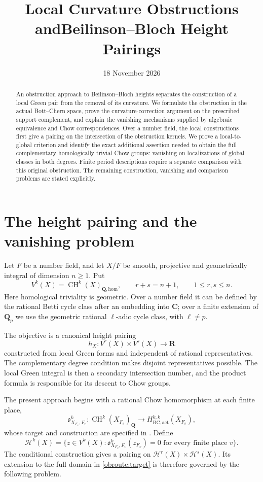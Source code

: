 \documentclass[11pt,a4paper]{article}
\title{Local Curvature Obstructions and\newline Beilinson--Bloch Height Pairings}
\author{}
\date{18 November 2026}
\theoremstyle{definition}
\numberwithin{equation}{section}
\newcommand{\CH}{\operatorname{CH}}
\newcommand{\Ob}{\mathfrak o}
\newcommand{\homol}{\mathrm{hom}}
\newcommand{\Q}{\mathbf Q}
\newcommand{\R}{\mathbf R}
\begin{document}
\maketitle
\begin{abstract}
An obstruction approach to Beilinson--Bloch heights separates the construction of a local Green pair from the removal of its curvature. We formulate the obstruction in the actual Bott--Chern space, prove the curvature-correction argument on the prescribed support complement, and explain the vanishing mechanisms supplied by algebraic equivalence and Chow correspondences. Over a number field, the local constructions first give a pairing on the intersection of the obstruction kernels. We prove a local-to-global criterion and identify the exact additional assertion needed to obtain the full complementary homologically trivial Chow groups: vanishing on localizations of global classes in both degrees. Finite period descriptions require a separate comparison with this original obstruction. The remaining construction, vanishing and comparison problems are stated explicitly.
\end{abstract}
\tableofcontents

\section{The height pairing and the vanishing problem}\label{obroute:introduction}

Let $F$ be a number field, and let $X/F$ be smooth, projective and geometrically integral of dimension $n\ge1$. Put
\[
 V^k(X)=\CH^k(X)_{\Q,\homol},\qquad r+s=n+1,
 \qquad 1\le r,s\le n.
\]
Here homological triviality is geometric. Over a number field it can be defined by the rational Betti cycle class after an embedding into $\mathbf C$; over a finite extension of $\Q_p$ we use the geometric rational $\ell$-adic cycle class, with $\ell\ne p$.

The objective is a canonical height pairing
\begin{equation}\label{obroute:target}
 h_X:V^r(X)\times V^s(X)\longrightarrow\R
\end{equation}
constructed from local Green forms and independent of rational representatives. The complementary degree condition makes disjoint representatives possible. The local Green integral is then a secondary intersection number, and the product formula is responsible for its descent to Chow groups.

The present approach begins with a rational Chow homomorphism at each finite place,
\[
 \Ob^k_{X_{F_v},F_v}:\CH^k(X_{F_v})_\Q
       \longrightarrow H^{k,k}_{\mathrm{BC,act}}(X_{F_v}),
\]
whose target and construction are specified in . Define
\begin{equation}\label{obroute:kernel}
 \mathcal H^k(X)=
 \{z\in V^k(X):\Ob^k_{X_{F_v},F_v}(z_{F_v})=0
                   \text{ for every finite place }v\}.
\end{equation}
The conditional construction gives a pairing on $\mathcal H^r(X)\times\mathcal H^s(X)$. Its extension to the full domain in \eqref{obroute:target} is therefore governed by the following problem.
\end{document}
